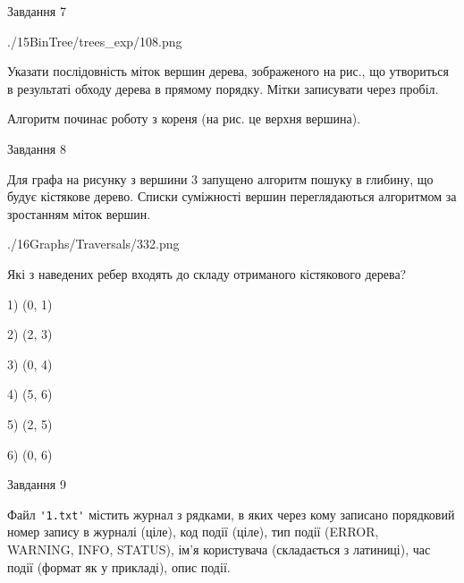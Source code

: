 \documentclass[12pt, ukrainian]{article}
\def\code#1{\Verb!#1!}
\begin{document}
{\newpage
\begin{minipage}[t]{9.7cm}
               
{\begin{center}Завдання {7}\end{center}}
\vspace{-6mm}

\begin{center}
	{./15BinTree/trees_exp/108.png}
\end{center}
Указати послідовність міток вершин дерева, зображеного на рис., що утвориться в результаті обходу дерева в прямому порядку. Мітки записувати через пробіл.\par Алгоритм починає роботу з кореня (на рис. це верхня вершина).\par

\end{minipage}
\vline \hspace{8mm}
\begin{minipage}[t]{8.0cm}
               
{\begin{center}Завдання {8}\end{center}}
\vspace{-6mm}
Для графа на рисунку з вершини 3 запущено алгоритм пошуку в глибину, що будує кістякове дерево. Списки суміжності вершин переглядаються алгоритмом за зростанням міток вершин.\par
\begin{center}
	{./16Graphs/Traversals/332.png}
\end{center}
\par Які з наведених ребер входять до складу отриманого кістякового дерева?\par
1) (0, 1)\par
2) (2, 3)\par
3) (0, 4)\par
4) (5, 6)\par
5) (2, 5)\par
6) (0, 6)\par
{\vskip 15pt} \par

\end{minipage}

               
{\begin{center}Завдання {9}\end{center}}
\vspace{-6mm}
Файл \code{'1.txt'} містить журнал з рядками, в яких через кому записано поряд\-ко\-вий номер запису в журналі (ціле), код події (ціле), тип події (ERROR, \\WARNING, INFO, STATUS), ім'я користувача (складається з латиниці), час події (фор\-мат як у прикладі), опис події.

}
\end{document}
